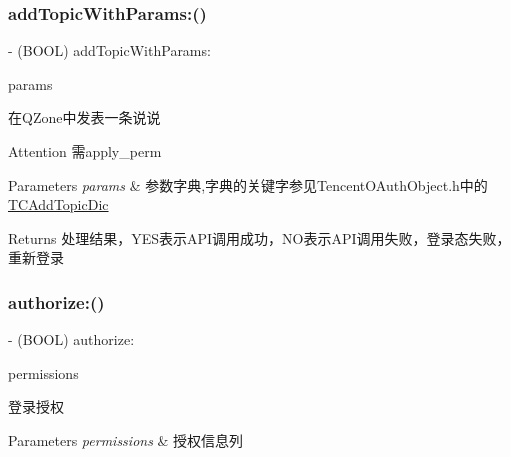 \subsubsection{\texorpdfstring{add\+Topic\+With\+Params\+:()}{addTopicWithParams:()}\hspace{0.1cm}{\footnotesize\ttfamily [2/2]}}
{\footnotesize\ttfamily -\/ (B\+O\+OL) add\+Topic\+With\+Params\+: \begin{DoxyParamCaption}\item[{(N\+S\+Mutable\+Dictionary $\ast$)}]{params }\end{DoxyParamCaption}}

在\+Q\+Zone中发表一条说说 \begin{DoxyAttention}{Attention}
需apply\+\_\+perm 
\end{DoxyAttention}

\begin{DoxyParams}{Parameters}
{\em params} & 参数字典,字典的关键字参见\+Tencent\+O\+Auth\+Object.\+h中的\mbox{\hyperlink{interface_t_c_add_topic_dic}{T\+C\+Add\+Topic\+Dic}} \\
\hline
\end{DoxyParams}
\begin{DoxyReturn}{Returns}
处理结果，\+Y\+E\+S表示\+A\+P\+I调用成功，\+N\+O表示\+A\+P\+I调用失败，登录态失败，重新登录 
\end{DoxyReturn}
\mbox{\label{interface_tencent_o_auth_a996be450c28db1855873e0853b9fcf27}} 
\subsubsection{\texorpdfstring{authorize\+:()}{authorize:()}\hspace{0.1cm}{\footnotesize\ttfamily [1/2]}}
{\footnotesize\ttfamily -\/ (B\+O\+OL) authorize\+: \begin{DoxyParamCaption}\item[{(N\+S\+Array $\ast$)}]{permissions }\end{DoxyParamCaption}}

登录授权


\begin{DoxyParams}{Parameters}
{\em permissions} & 授权信息列 \\
\hline
\end{DoxyParams}
\mbox{\label{interface_tencent_o_auth_a996be450c28db1855873e0853b9fcf27}} 
